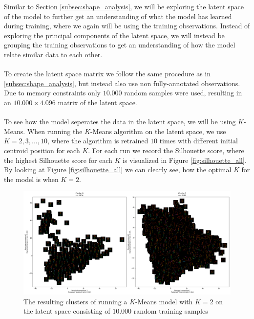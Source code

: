 \documentclass[./main.tex]{subfiles}
\begin{document}
\noindent Similar to Section \ref{subsec:shape_analysis}, we will be exploring the latent space of the model to further get an understanding of what the model has learned during training, where we again will be using the training observations. Instead of exploring the principal components of the latent space, we will instead be grouping the training observations to get an understanding of how the model relate similar data to each other.
\\
\\
To create the latent space matrix we follow the same procedure as in \ref{subsec:shape_analysis}, but instead also use non fully-annotated observations. Due to memory constraints only $10.000$ random samples were used, resulting in an $10.000 \times 4.096$ matrix of the latent space.
\\
\\
To see how the model seperates the data in the latent space, we will be using $K$-Means. When running the $K$-Means algorithm on the latent space, we use $K = 2, 3, ..., 10$, where the algorithm is retrained $10$ times with different initial centroid position for each $K$. For each run we record the Silhouette score, where the highest Silhouette score for each $K$ is visualized in Figure \ref{fig:silhouette_all}. By looking at Figure \ref{fig:silhouette_all} we can clearly see, how the optimal $K$ for the model is when $K = 2$.
\\
\begin{figure}[h]
    \centering
    \includegraphics[width = \textwidth]{entities/cluster_all_skeletons.png}
    \caption{The resulting clusters of running a $K$-Means model with $K = 2$ on the latent space consisting of $10.000$ random training samples}
    \label{fig:clusters_all_skeletons}
\end{figure}
\\
\end{document}
